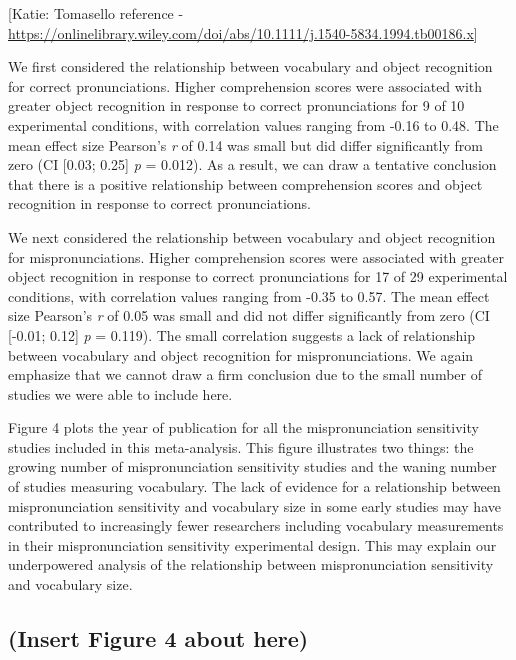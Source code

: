 \documentclass[man]{apa6}
\theoremstyle{definition}
\theoremstyle{definition}
\theoremstyle{definition}
\theoremstyle{remark}
\begin{document}
{[}Katie: Tomasello reference -
\url{https://onlinelibrary.wiley.com/doi/abs/10.1111/j.1540-5834.1994.tb00186.x}{]}

We first considered the relationship between vocabulary and object
recognition for correct pronunciations. Higher comprehension scores were
associated with greater object recognition in response to correct
pronunciations for 9 of 10 experimental conditions, with correlation
values ranging from -0.16 to 0.48. The mean effect size Pearson's
\emph{r} of 0.14 was small but did differ significantly from zero (CI
{[}0.03; 0.25{]} \emph{p} = 0.012). As a result, we can draw a tentative
conclusion that there is a positive relationship between comprehension
scores and object recognition in response to correct pronunciations.

We next considered the relationship between vocabulary and object
recognition for mispronunciations. Higher comprehension scores were
associated with greater object recognition in response to correct
pronunciations for 17 of 29 experimental conditions, with correlation
values ranging from -0.35 to 0.57. The mean effect size Pearson's
\emph{r} of 0.05 was small and did not differ significantly from zero
(CI {[}-0.01; 0.12{]} \emph{p} = 0.119). The small correlation suggests
a lack of relationship between vocabulary and object recognition for
mispronunciations. We again emphasize that we cannot draw a firm
conclusion due to the small number of studies we were able to include
here.

Figure 4 plots the year of publication for all the mispronunciation
sensitivity studies included in this meta-analysis. This figure
illustrates two things: the growing number of mispronunciation
sensitivity studies and the waning number of studies measuring
vocabulary. The lack of evidence for a relationship between
mispronunciation sensitivity and vocabulary size in some early studies
may have contributed to increasingly fewer researchers including
vocabulary measurements in their mispronunciation sensitivity
experimental design. This may explain our underpowered analysis of the
relationship between mispronunciation sensitivity and vocabulary size.

\subsection{(Insert Figure 4 about
here)}\label{insert-figure-4-about-here}
\end{document}
